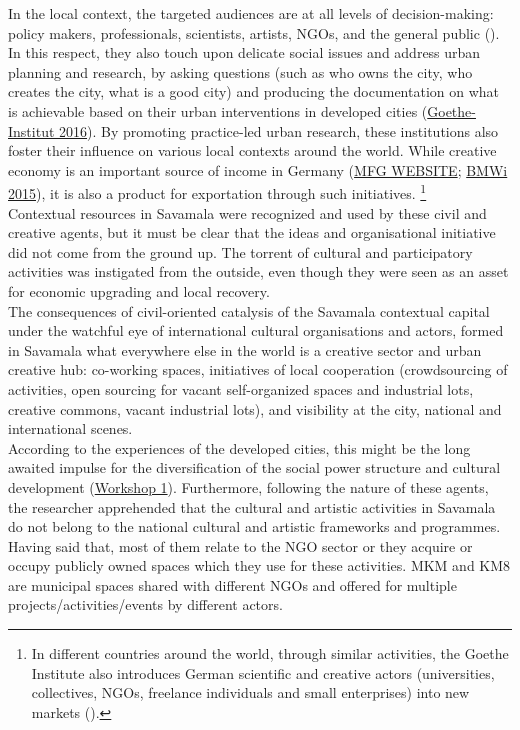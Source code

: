 \documentclass[11pt]{report}
\begin{document}
{{{{In the local context, the targeted audiences are at all levels of decision-making: policy makers, professionals, scientists, artists, NGOs, and the general public (\href{British}{\citealt{british_council_creativity_2014}}).
In this respect, they also touch upon delicate social issues and address urban planning and research, by asking questions (such as who owns the city, who creates the city, what is a good city) and producing the documentation on what is achievable based on their urban interventions in developed cities (\href{ref}{Goethe-Institut 2016}).
By promoting practice-led urban research, these institutions also foster their influence on various local contexts around the world.
While creative economy is an important source of income in Germany (\href{MFG}{MFG WEBSITE}; \href{BMWi}{BMWi 2015}), it is also a product for exportation through such initiatives.
\footnote{In different countries around the world, through similar activities, the Goethe Institute also introduces German scientific and creative actors (universities, collectives, NGOs, freelance individuals and small enterprises) into new markets (\href{ref}{\citealt{waibel_creativity_2014}}).}
\\

Contextual resources in Savamala were recognized and used by these civil and creative agents, but it must be clear that the ideas and organisational initiative  did not come from the ground up.
The torrent of cultural and participatory activities was instigated from the outside, even though they were seen as an asset for economic upgrading and local recovery.
\\

The consequences of civil-oriented catalysis of the Savamala contextual capital under the watchful eye of international cultural organisations and actors, formed in Savamala what everywhere else in the world is a creative sector and urban creative hub: co-working spaces, initiatives of local cooperation (crowdsourcing of activities, open sourcing for vacant self-organized spaces and industrial lots, creative commons, vacant industrial lots), and visibility at the city, national and international scenes.
\\

According to the experiences of the developed cities, this might be the long awaited impulse for the diversification of the social power structure and cultural development 
(\href{Expert Workshop}{Workshop 1}).
Furthermore, following the nature of these agents, the researcher apprehended that the cultural and artistic activities in Savamala do not belong to the national cultural and artistic frameworks and programmes.
Having said that, most of them relate to the NGO sector or they acquire or occupy publicly owned spaces which they use for these activities.
MKM and KM8 are municipal spaces shared with different NGOs and offered for multiple projects/activities/events by different actors.
\\

}}}}
\end{document}
